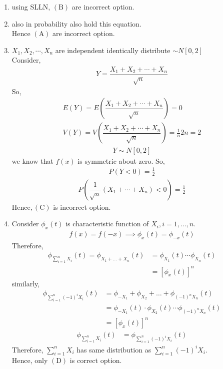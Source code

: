 \documentclass[journal,12pt,twocolumn]{IEEEtran}
\begin{document}
\begin{enumerate}[label=\alph*)]
\item using SLLN, $(\mathrm{B})$ are incorrect option.
\item also in probability also hold this equation.\\
Hence $(\mathrm{A})$ are incorrect option.  
\item $X_{1}, X_{2}, \cdots,X_n$ are independent identically distribute $\sim N[0,2]$\\
Consider,
\begin{align}
Y=\dfrac{X_{1}+ X_{2}+ \cdots + X_n}{\sqrt{n}}
\end{align}
So,
\begin{align}
E(Y)= E\left(\dfrac{X_{1}+ X_{2}+ \cdots+X_n}{\sqrt{n}}\right)= 0\\
V(Y)= V\left(\dfrac{X_{1}+ X_{2}+ \cdots+X_n}{\sqrt{n}}\right)= \frac{1}{n}2n=2
\end{align}
\begin{align}
Y \sim N[0,2]
\end{align}
we know that $f(x)$ is symmetric about zero. So,
\begin{align}
P(Y<0)=\frac{1}{2}
\end{align}
\begin{align}
P\left(\dfrac{1}{\sqrt{n}}\left(X_{1}+\cdots+X_{n}\right)<0\right)=\frac{1}{2}
\end{align}
Hence$,(\mathrm{C})$ is incorrect option.
\item Consider $\phi_{x}(t)$ is characteristic function of $X_{i}, i=1, \ldots, n.$
\begin{align}
f(x)=f(-x)\implies \phi_{x}(t)=\phi_{-x}(t)
\end{align}
Therefore,
\begin{align}
\phi_{\sum_{i=1}^{n}X_i}(t) = \phi_{X_{1}+\ldots +X_{n}}(t) &=\phi_{X_{1}}(t)\cdots\phi_{X_{n}}(t)\\
&=\left[\phi_{x}(t)\right]^{n}
\end{align}
similarly,
\begin{align}
\phi_{\sum_{i=1}^{n}(-1)^{i}X_i}(t) &= \phi_{-X_{1}}+\phi_{X_{2}}+\ldots +\phi_{(-1)^{n}X_{n}}(t)\\
&=\phi_{-X_{1}}(t) \cdot \phi_{X_{2}}(t)\cdots\phi_{(-1)^{n}X_{n}}(t)\\
&=\left[\phi_{x}(t)\right]^{n}
\end{align}
\begin{align}
\phi_{\sum_{i=1}^{n}X_i}(t) &= \phi_{\sum_{i=1}^{n}(-1)^{i}X_i}(t)
\end{align}
Therefore, $\sum_{i=1}^{n} X_{i}$ has same distribution as $\sum_{i=1}^{n}(-1)^{i} X_{i}.$\\
Hence, only $(\mathrm{D})$ is correct option.
\end{enumerate}
\end{document}
